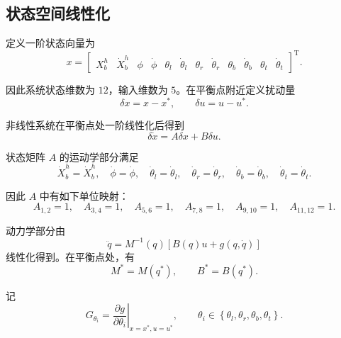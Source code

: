 \documentclass[UTF8,a4paper,12pt]{ctexart}
\begin{document}
\subsection{状态空间线性化}

定义一阶状态向量为
\begin{equation}
    x =
    \begin{bmatrix}
        X_b^h &
        \dot X_b^h &
        \phi &
        \dot\phi &
        \theta_l &
        \dot\theta_l &
        \theta_r &
        \dot\theta_r &
        \theta_b &
        \dot\theta_b &
        \theta_t &
        \dot\theta_t
    \end{bmatrix}^{\mathrm T}.
\end{equation}

因此系统状态维数为 $12$，输入维数为 $5$。在平衡点附近定义扰动量
\begin{equation}
    \delta x = x - x^\ast,
    \qquad
    \delta u = u - u^\ast.
\end{equation}

非线性系统在平衡点处一阶线性化后得到
\begin{equation}
    \delta \dot x = A\delta x + B\delta u.
\end{equation}

状态矩阵 $A$ 的运动学部分满足
\begin{equation}
    \dot X_b^h = \dot X_b^h,
    \quad
    \dot\phi = \dot\phi,
    \quad
    \dot\theta_l = \dot\theta_l,
    \quad
    \dot\theta_r = \dot\theta_r,
    \quad
    \dot\theta_b = \dot\theta_b,
    \quad
    \dot\theta_t = \dot\theta_t.
\end{equation}

因此 $A$ 中有如下单位映射：
\begin{equation}
    A_{1,2}=1,\quad
    A_{3,4}=1,\quad
    A_{5,6}=1,\quad
    A_{7,8}=1,\quad
    A_{9,10}=1,\quad
    A_{11,12}=1.
\end{equation}

动力学部分由
\begin{equation}
    \ddot q =
    M^{-1}(q)
    \left[
        B(q)u + g(q,\dot q)
    \right]
\end{equation}
线性化得到。在平衡点处，有
\begin{equation}
    M^\ast = M(q^\ast),
    \qquad
    B^\ast = B(q^\ast).
\end{equation}

记
\begin{equation}
    G_{\theta_i}
    =
    \left.
    \frac{\partial g}{\partial \theta_i}
    \right|_{x=x^\ast,u=u^\ast},
    \qquad
    \theta_i \in
    \left\{
        \theta_l,\theta_r,\theta_b,\theta_t
    \right\}.
\end{equation}
\end{document}
